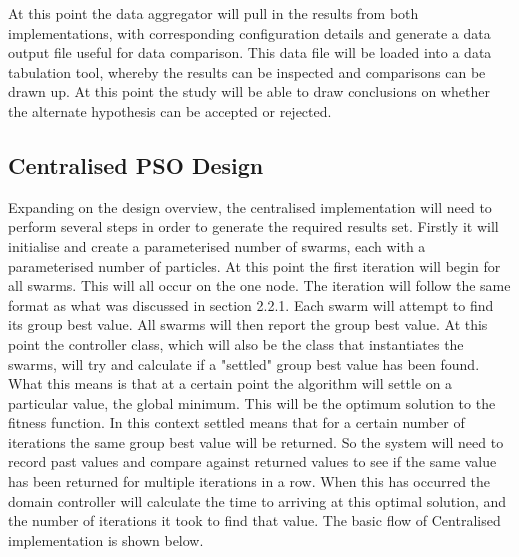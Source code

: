 \documentclass[oneside,12pt]{book}
\begin{document}
At this point the data aggregator will pull in the results from both implementations, with corresponding configuration details and generate a data output file useful for data comparison. This data file will be loaded into a data tabulation tool, whereby the results can be inspected and comparisons can be drawn up. At this point the study will be able to draw conclusions on whether the alternate hypothesis can be accepted or rejected.  

\subsection{Centralised PSO Design}
Expanding on the design overview, the centralised implementation will need to perform several steps in order to generate the required results set. Firstly it will initialise and create a parameterised number of swarms, each with a parameterised number of particles. At this point the first iteration will begin for all swarms. This will all occur on the one node. The iteration will follow the same format as what was discussed in section 2.2.1. Each swarm will attempt to find its group best value. All swarms will then report the group best value. At this point the controller class, which will also be the class that instantiates the swarms, will try and calculate if a "settled" group best value has been found. What this means is that at a certain point the algorithm will settle on a particular value, the global minimum. This will be the optimum solution to the fitness function. In this context settled means that for a certain number of iterations the same group best value will be returned. So the system will need to record past values and compare against returned values to see if the same value has been returned for multiple iterations in a row. When this has occurred the domain controller will calculate the time to arriving at this optimal solution, and the number of iterations it took to find that value. 
The basic flow of Centralised implementation is shown below. 
\end{document}
